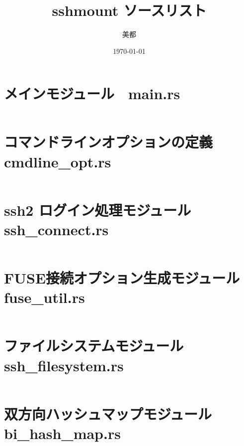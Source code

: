 \documentclass[paper=a4paper, fontsize=10pt, head_space=10mm, foot_space=17mm, gutter=17mm, line_length=185mm, twoside]{jlreq}
\title{sshmount ソースリスト}
\author{美都}
\date{\today}
\begin{document}
\maketitle
\tableofcontents
\clearpage

\section{メインモジュール　main.rs}
\inputminted[linenos, breaklines]{rust}{src/main.rs}
\clearpage

\section{コマンドラインオプションの定義 cmdline\_opt.rs}
\inputminted[linenos, breaklines]{rust}{src/cmdline_opt.rs}
\clearpage

\section{ssh2 ログイン処理モジュール ssh\_connect.rs}
\inputminted[linenos, breaklines]{rust}{src/ssh_connect.rs}
\clearpage

\section{FUSE接続オプション生成モジュール fuse\_util.rs}
\inputminted[linenos, breaklines]{rust}{src/fuse_util.rs}
\clearpage

\section{ファイルシステムモジュール ssh\_filesystem.rs}
\inputminted[linenos, breaklines]{rust}{src/ssh_filesystem.rs}
\clearpage

\section{双方向ハッシュマップモジュール bi\_hash\_map.rs}
\inputminted[linenos, breaklines]{rust}{src/bi_hash_map.rs}
\end{document}
